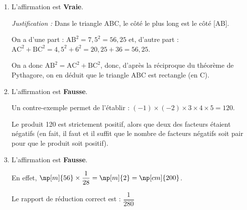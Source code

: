 
\medskip

\begin{enumerate}
	\item L'affirmation est \textbf{Vraie}.
	
	\textit{Justification :} Dans le triangle ABC, le côté le plus long est le côté [AB]. 
	
On a d'une part : $\text{AB}^2 = 7,5^2 = 56,25$ \qquad et, d'autre part : $\text{AC}^2  + \text{BC}^2 = 4,5^2 + 6^2 = 20,25 + 36 = 56,25$.
	
On a donc $\text{AB}^2 = \text{AC}^2 + \text{BC}^2$, donc, d'après la réciproque du théorème de Pythagore, on en déduit que le triangle ABC est rectangle (en C).
	
	\item L'affirmation est \textbf{Fausse}.
	
Un contre-exemple permet de l'établir : $(-1) \times (-2) \times 3 \times 4 \times 5 = 120$.
	
Le produit 120 est strictement positif, alors que deux des facteurs étaient négatifs (en fait, il faut et il suffit que le nombre de facteurs négatifs soit pair pour que le produit soit positif).
	
	\item L'affirmation est \textbf{Fausse}.
	
En effet, $\np[m]{56} \times \dfrac{1}{28}= \np[m]{2} = \np[cm]{200}$.
	
Le rapport de réduction correct est : $\dfrac{1}{280}$
\end{enumerate}

\vspace{0,5cm}

